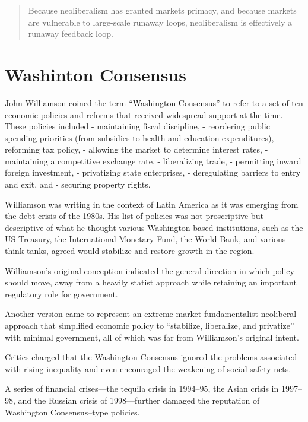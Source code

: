 \documentclass[
]{book}
\begin{document}
\begin{quote}
Because neoliberalism has granted markets primacy, and because markets are vulnerable to large-scale runaway loops, neoliberalism is effectively a runaway feedback loop.
\end{quote}

\hypertarget{washinton-consensus}{%
\section{Washinton Consensus}\label{washinton-consensus}}

John Williamson coined the term ``Washington Consensus'' to refer to a set of ten economic policies and reforms that received widespread support at the time.
These policies included
- maintaining fiscal discipline,
- reordering public spending priorities (from subsidies to health and education expenditures),
- reforming tax policy,
- allowing the market to determine interest rates,
- maintaining a competitive exchange rate,
- liberalizing trade,
- permitting inward foreign investment,
- privatizing state enterprises,
- deregulating barriers to entry and exit, and
- securing property rights.

Williamson was writing in the context of Latin America as it was emerging from the debt crisis of the 1980s. His list of policies was not proscriptive but descriptive of what he thought various Washington-based institutions, such as the US Treasury, the International Monetary Fund, the World Bank, and various think tanks, agreed would stabilize and restore growth in the region.

Williamson's original conception indicated the general direction in which policy should move, away from a heavily statist approach while retaining an important regulatory role for government.

Another version came to represent an extreme market-fundamentalist neoliberal approach that simplified economic policy to ``stabilize, liberalize, and privatize'' with minimal government, all of which was far from Williamson's original intent.

Critics charged that the Washington Consensus ignored the problems associated with rising inequality and even encouraged the weakening of social safety nets.

A series of financial crises---the tequila crisis in 1994--95, the Asian crisis in 1997--98, and the Russian crisis of 1998---further damaged the reputation of Washington Consensus--type policies.
\end{document}
